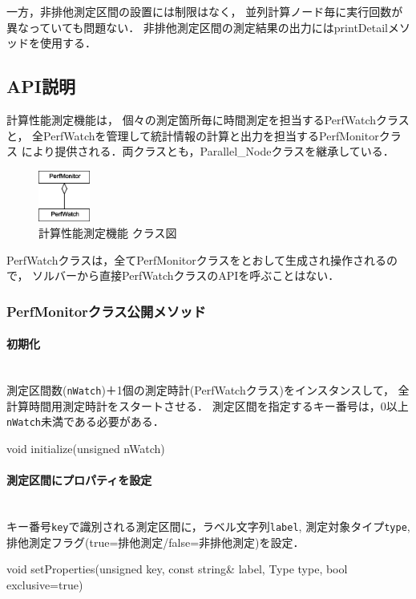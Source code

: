 一方，非排他測定区間の設置には制限はなく，
並列計算ノード毎に実行回数が異なっていても問題ない．
非排他測定区間の測定結果の出力にはprintDetailメソッドを使用する．


\subsection{API説明}
計算性能測定機能は，
個々の測定箇所毎に時間測定を担当するPerfWatchクラスと，
全PerfWatchを管理して統計情報の計算と出力を担当するPerfMonitorクラス
により提供される．両クラスとも，Parallel\_Nodeクラスを継承している．
\begin{figure}[H]
\vspace{0.5cm}
\begin{center}
\includegraphics[width=0.15\textwidth]{PerfMonitor.eps}
\caption{計算性能測定機能 クラス図}
\label{fig:timing}
\end{center}
\end{figure}

PerfWatchクラスは，全てPerfMonitorクラスをとおして生成され操作されるので，
ソルバーから直接PerfWatchクラスのAPIを呼ぶことはない．

\subsubsection{PerfMonitorクラス公開メソッド}
\paragraph{初期化}\mbox{}\\
測定区間数({\tt nWatch})＋1個の測定時計(PerfWatchクラス)をインスタンスして，
全計算時間用測定時計をスタートさせる．
測定区間を指定するキー番号は，0以上{\tt nWatch}未満である必要がある．
{\small
\begin{program}
void initialize(unsigned nWatch)
\end{program}
}

\paragraph{測定区間にプロパティを設定}\mbox{}\\
キー番号{\tt key}で識別される測定区間に，ラベル文字列{\tt label},
測定対象タイプ{\tt type}, 排他測定フラグ(true=排他測定/false=非排他測定)を設定．
{\small
\begin{program}
void setProperties(unsigned key, const string& label, Type type,
                   bool exclusive=true)
\end{program}
}

